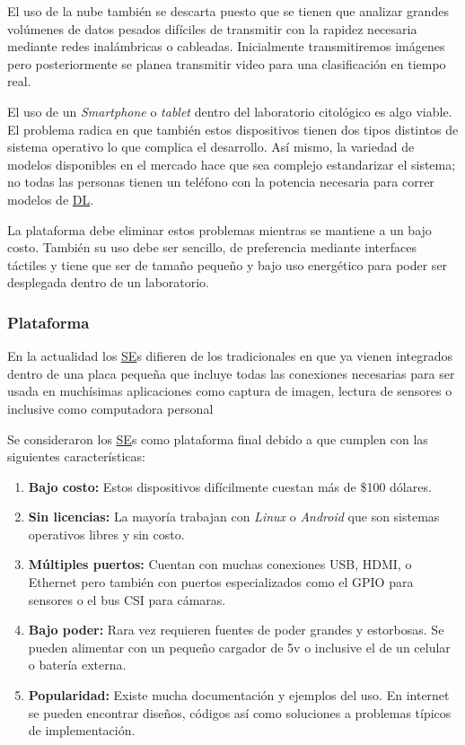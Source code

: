 El uso de la nube también se descarta puesto que se tienen que analizar grandes
volúmenes de datos pesados difíciles de transmitir con la rapidez necesaria
mediante redes inalámbricas o cableadas. Inicialmente transmitiremos imágenes
pero posteriormente se planea transmitir video para una clasificación en tiempo
real.

El uso de un \emph{Smartphone} o \emph{tablet} dentro del laboratorio
citológico es algo viable. El problema radica en que también estos dispositivos
tienen dos tipos distintos de sistema operativo lo que complica el desarrollo.
Así mismo, la variedad de modelos disponibles en el mercado hace que sea
complejo estandarizar el sistema; no todas las personas tienen un teléfono con
la potencia necesaria para correr modelos de \hyperlink{abbr}{DL}. 

La plataforma debe eliminar estos problemas mientras se mantiene a un bajo
costo. También su uso debe ser sencillo, de preferencia mediante interfaces
táctiles y tiene que ser de tamaño pequeño y bajo uso energético para poder ser
desplegada dentro de un laboratorio.

\subsubsection{Plataforma}

En la actualidad los \hyperlink{abbr}{SE}s difieren de los tradicionales en que
ya vienen integrados dentro de una placa pequeña que incluye todas las
conexiones necesarias para ser usada en muchísimas aplicaciones como captura de
imagen, lectura de sensores o inclusive como computadora personal

Se consideraron los \hyperlink{abbr}{SE}s como plataforma final debido a que
cumplen con las siguientes características:

\begin{enumerate}
    \item{\textbf{Bajo costo: }} Estos dispositivos difícilmente cuestan más de
    \$100 dólares.
    \item{\textbf{Sin licencias: }} La mayoría trabajan con \emph{Linux} o
    \emph{Android} que son sistemas operativos libres y sin costo.
    \item{\textbf{Múltiples puertos: }} Cuentan con muchas conexiones USB, HDMI,
    o Ethernet pero también con puertos especializados como el GPIO para
    sensores o el bus CSI para cámaras.
    \item{\textbf{Bajo poder: }} Rara vez requieren fuentes de poder grandes y
    estorbosas. Se pueden alimentar con un pequeño cargador de 5v o inclusive el
    de un celular o batería externa.
    \item{\textbf{Popularidad: }} Existe mucha documentación y ejemplos del uso.
    En internet se pueden encontrar diseños, códigos así como soluciones a
    problemas típicos de implementación.
\end{enumerate}


